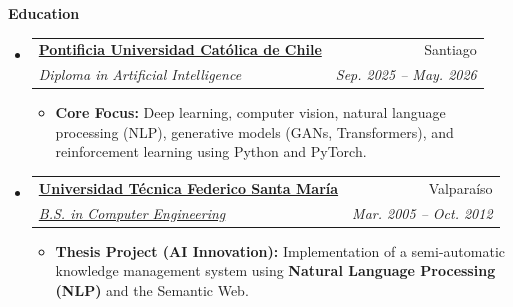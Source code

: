 \documentclass[letterpaper,11pt]{article}
\makeatletter
\newcommand{\resitem}[1]{\item #1 \vspace{-2pt}}
\newcommand{\resheading}[1]{{\large \colorbox{mygrey}{\begin{minipage}{\textwidth}{\textbf{#1 \vphantom{p\^{E}}}}\end{minipage}}}}
\newcommand{\ressubheading}[4]{
    \begin{tabular*}{6.5in}{l@{\extracolsep{\fill}}r}
            \textbf{#1} & #2 \\
            \textit{#3} & \textit{#4} \\
    \end{tabular*}\vspace{-6pt}}
\makeatother
\begin{document}
    \newpage
    \resheading{Education}
        \begin{itemize}
            \item
                \ressubheading{\href{https://educacionprofesional.ing.uc.cl/?diplomado=diplomado-en-inteligencia-artificial}{Pontificia Universidad Católica de Chile}}{Santiago}{Diploma in Artificial Intelligence}{Sep. 2025 -- May. 2026}
                    { \footnotesize
                    \begin{itemize}
                        \resitem{\textbf{Core Focus:} Deep learning, computer vision, natural language processing (NLP), generative models (GANs, Transformers), and reinforcement learning using Python and PyTorch.}
                    \end{itemize}
                    }
            \item
                \ressubheading{\href{http://www.usm.cl}{Universidad Técnica Federico Santa María}}{Valparaíso}{\href{http://www.inf.utfsm.cl}{B.S. in Computer Engineering }}{Mar. 2005 -- Oct. 2012}
                    { \footnotesize
                    \begin{itemize}
                        \resitem{\textbf{Thesis Project (AI Innovation):} Implementation of a semi-automatic knowledge management system using \textbf{Natural Language Processing (NLP)} and the Semantic Web.}
                    \end{itemize}
                    }
        \end{itemize}
\end{document}
